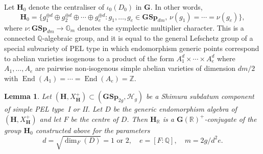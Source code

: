\documentclass[11pt]{article}
\numberwithin{equation}{section}
\newcommand{\bG}{\mathbb{G}}
\newcommand{\bQ}{\mathbb{Q}}
\newcommand{\bR}{\mathbb{R}}
\newcommand{\bZ}{\mathbb{Z}}
\newcommand{\Hg}{\mathcal{H}_g}
\newcommand{\gG}{\mathbf{G}}
\newcommand{\gGSp}{\mathbf{GSp}}
\newcommand{\gH}{\mathbf{H}}
\DeclareMathOperator{\End}{End}
\newtheorem{lemma}{Lemma}[section]
\begin{document}
Let $\gH_0$ denote the centraliser of $\iota_0(D_0)$ in $\gG$.
In other words,
\begin{equation} \label{eqn:H0}
\gH_0 = \{ g_1^{\oplus d} \oplus g_2^{\oplus d} \oplus \dotsb \oplus g_e^{\oplus d} :
g_1, \dotsc, g_e \in \gGSp_{dm},
\, \nu(g_1) = \dotsb = \nu(g_e) \},
\end{equation}
where $\nu \colon \gGSp_{dm} \to \bG_m$ denotes the symplectic multiplier character.
This is a connected $\bQ$-algebraic group, and it is equal to the general Lefschetz group of a special subvariety of PEL type in which endomorphism generic points correspond to abelian varieties isogenous to a product of the form $A_1^d \times \dotsb \times A_e^d$ where $A_1, \dotsc, A_e$ are pairwise non-isogenous simple abelian varieties of dimension $dm/2$ with $\End(A_1) = \dotsb = \End(A_e) = \bZ$.

\begin{lemma} \label{conj-class-mt}
Let $(\gH, X_\gH^+) \subset (\gGSp_{2g}, \Hg)$ be a Shimura subdatum component of simple PEL type~I or II.
Let $D$ be the generic endomorphism algebra of $(\gH, X_\gH^+)$ and let $F$ be the centre of $D$.
Then $\gH_\bR$ is a $\gG(\bR)^+$-conjugate of the group $\gH_0$ constructed above for the parameters
\[
d = \sqrt{\dim_F(D)} = 1 \text{ or } 2, \quad e = [F:\bQ], \quad m = 2g/d^2e.
\]
\end{lemma}
\end{document}
